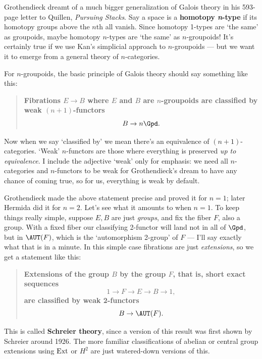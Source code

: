 \documentclass[12pt]{amsart}
\begin{document}
Grothendieck dreamt of a much bigger generalization of Galois 
theory in his 593-page letter to Quillen, {\it Pursuing Stacks}.  
Say a space is a \textbf{homotopy \textit{n}-type} 
if its homotopy groups above the $n$th all vanish.  Since
homotopy 1-types are `the same' as groupoids,
maybe homotopy $n$-types are `the same' as $n$-groupoids!
It's certainly true if we use Kan's simplicial approach to
$n$-groupoids --- but we want it to emerge from a general theory
of $n$-categories.  

For $n$-groupoids, the basic principle of Galois
theory should say something like this:

\begin{quote}
\textbf{Fibrations $E \to B$ where $E$ and $B$ are 
$n$-groupoids are classified by weak $(n+1)$-functors 
\[     B \to n\Gpd. \]}
\end{quote}

\noindent
Now when we say `classified by' we mean there's an
equivalence of $(n+1)$-categories.  `Weak' $n$-functors
are those where everything is preserved {\it up to equivalence}. 
I include the adjective `weak' only for emphasis: we
need all $n$-categories and $n$-functors to be weak 
for Grothendieck's dream to have any chance of coming true,
so for us, everything is weak by default.

Grothendieck made the above statement precise and proved it
for $n = 1$; later Hermida did it for $n = 2$.
Let's see what it amounts to when $n = 1$.  To keep things
really simple, suppose $E,B$ are 
just {\it groups}, and fix the fiber $F$, also a group.
With a fixed fiber our classifying 2-functor will land not in 
all of $\Gpd$, but in $\AUT(F)$, which is the `automorphism 2-group' 
of $F$ --- I'll say exactly what that is in a minute.
In this simple case fibrations are just {\it extensions},
so we get a statement like this:

\begin{quote}
\textbf{Extensions of the group $B$ by the group 
$F$, that is, short exact sequences 
\[          1 \to F \to E \to B \to 1,  \]
are classified by weak 2-functors 
\[               B \to \AUT(F) .\]
}
\end{quote}

\noindent
This is called {\bf Schreier theory}, since a version of this result
was first shown by Schreier around 1926.  The more familiar classifications 
of abelian or central group extensions using ${\rm Ext}$ or $H^2$ are just
watered-down versions of this.
\end{document}
